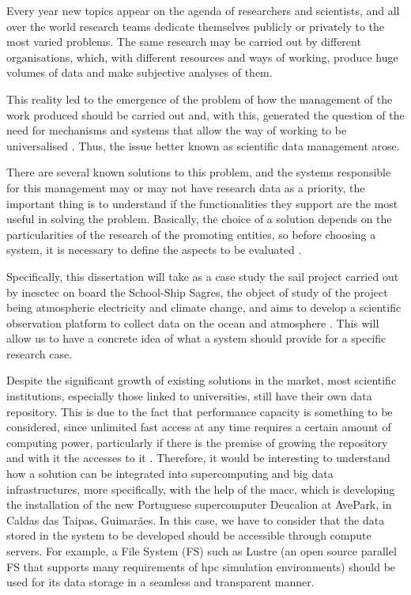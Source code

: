 Every year new topics appear on the agenda of researchers and scientists, and all over the world research teams dedicate themselves publicly or privately to the most varied problems. The same research may be carried out by different organisations, which, with different resources and ways of working, produce huge volumes of data and make subjective analyses of them. 

This reality led to the emergence of the problem of how the management of the work produced should be carried out and, with this, generated the question of the need for mechanisms and systems that allow the way of working to be universalised \citep{9}. Thus, the issue better known as scientific data management arose.

There are several known solutions to this problem, and the systems responsible for this management may or may not have research data as a priority, the important thing is to understand if the functionalities they support are the most useful in solving the problem. Basically, the choice of a solution depends on the particularities of the research of the promoting entities, so before choosing a system, it is necessary to define the aspects to be evaluated \citep{dong}.
  
Specifically, this dissertation will take as a case study the \gls{sail} project carried out by \gls{inesctec} on board the School-Ship Sagres, the object of study of the project being atmospheric electricity and climate change, and aims to develop a scientific observation platform to collect data on the ocean and atmosphere \citep{2}. This will allow us to have a concrete idea of what a system should provide for a specific research case.
 
Despite the significant growth of existing solutions in the market, most scientific institutions, especially those linked to universities, still have their own data repository. This is due to the fact that performance capacity is something to be considered, since unlimited fast access at any time requires a certain amount of computing power, particularly if there is the premise of growing the repository and with it the accesses to it \citep{6}. Therefore, it would be interesting to understand how a solution can be integrated into supercomputing and big data infrastructures, more specifically, with the help of the \gls{macc}, which is developing the installation of the new Portuguese supercomputer Deucalion at AvePark, in Caldas das Taipas, Guimarães. In this case, we have to consider that the data stored in the system to be developed should be accessible through compute servers. For example, a File System (FS) such as Lustre (an open source parallel FS that supports many requirements of \gls{hpc} simulation environments) should be used for its data storage in a seamless and transparent manner.
